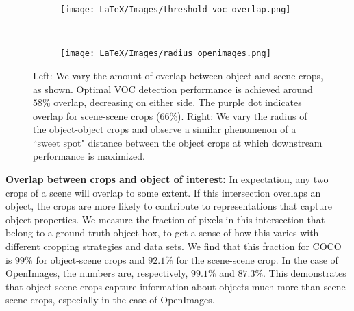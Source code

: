 \begin{figure*}[t!]
  \vspace{-10pt}
  \centering
  \begin{subfigure}[t]{0.48\textwidth}
   \centering
    \texttt{[image: LaTeX/Images/threshold\_voc\_overlap.png]}
   
     \label{fig:overlap_coco_voc}
  \end{subfigure} 
  ~
  \begin{subfigure}[t]{0.48\linewidth}
   \centering
    \texttt{[image: LaTeX/Images/radius\_openimages.png]}
  \label{fig:radius_openimages}
  \end{subfigure}
  \vspace{-0.2in}
    \caption{Left: We vary the amount of overlap between object and scene crops, as shown. Optimal VOC detection performance is achieved around $58\%$ overlap, decreasing on either side. The purple dot indicates overlap for scene-scene crops ($66\%$). Right: We vary the radius of the object-object crops and observe a similar phenomenon of a ``sweet spot" distance between the object crops at which downstream performance is maximized. }
\label{fig:radius_coco_openimages}
\end{figure*}



\textbf{Overlap between crops and object of interest:} In expectation, any two crops of a scene will overlap to some extent. If this intersection overlaps an object, the crops are more likely to contribute to representations that capture object properties.  We measure the fraction of pixels in this intersection that belong to a ground truth object box, to get a sense of how this varies with different cropping strategies and data sets.  We find that this fraction for COCO is $99\%$ for object-scene crops and $92.1\%$ for the scene-scene crop. In the case of OpenImages, the numbers are, respectively, $99.1\%$ and $87.3\%$.  This demonstrates that object-scene crops capture information about objects much more than scene-scene crops, especially in the case of OpenImages.

